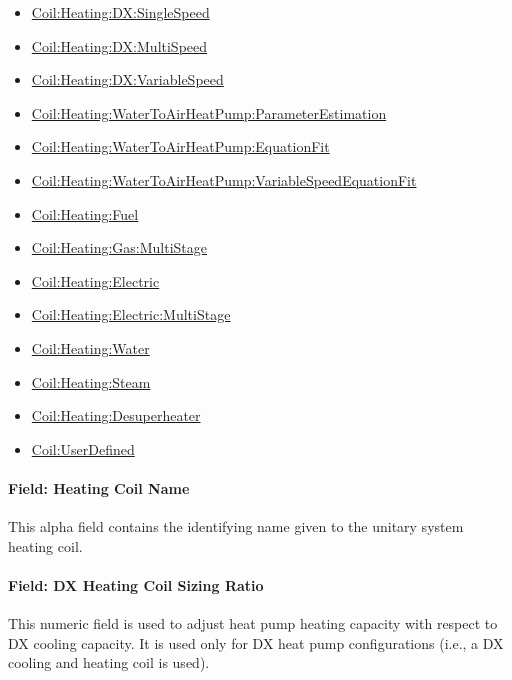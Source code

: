 \begin{itemize}
\item
  \hyperref[coilheatingdxsinglespeed]{Coil:Heating:DX:SingleSpeed}
\item
  \hyperref[coilheatingdxmultispeed]{Coil:Heating:DX:MultiSpeed}
\item
  \hyperref[coilheatingdxvariablespeed]{Coil:Heating:DX:VariableSpeed}
\item
  \hyperref[coilheatingwatertoairheatpumpparameterestimation]{Coil:Heating:WaterToAirHeatPump:ParameterEstimation}
\item
  \hyperref[coilheatingwatertoairheatpumpequationfit]{Coil:Heating:WaterToAirHeatPump:EquationFit}
\item
  \hyperref[coilheatingwatertoairheatpumpvariablespeedequationfit]{Coil:Heating:WaterToAirHeat\hyperref[pumpvariablespeed]{Pump:VariableSpeed}EquationFit}
\item
  \hyperref[coilheatinggas-000]{Coil:Heating:Fuel}
\item
  \hyperref[coilheatinggasmultistage]{Coil:Heating:Gas:MultiStage}
\item
  \hyperref[coilheatingelectric]{Coil:Heating:Electric}
\item
  \hyperref[coilheatingelectricmultistage]{Coil:Heating:Electric:MultiStage}
\item
  \hyperref[coilheatingwater]{Coil:Heating:Water}
\item
  \hyperref[coilheatingsteam]{Coil:Heating:Steam}
\item
  \hyperref[coilheatingdesuperheater]{Coil:Heating:Desuperheater}
\item
  \hyperref[coiluserdefined]{Coil:UserDefined}
\end{itemize}

\paragraph{Field: Heating Coil Name}\label{field-heating-coil-name-002}

This alpha field contains the identifying name given to the unitary system heating coil.

\paragraph{Field: DX Heating Coil Sizing Ratio}\label{field-dx-heating-coil-sizing-ratio}

This numeric field is used to adjust heat pump heating capacity with respect to DX cooling capacity. It is used only for DX heat pump configurations (i.e., a DX cooling and heating coil is used).

